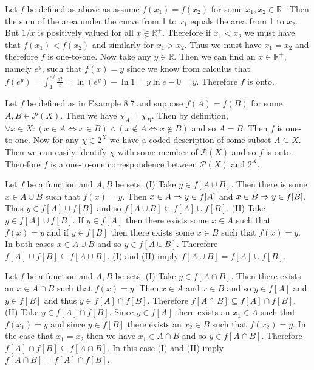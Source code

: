 \documentclass[11pt]{book}
\begin{document}
\begin{enumerate}
{Let $f$ be defined as above as assume $f(x_1)=f(x_2)$ for some $x_1,x_2\in\mathbb{R}^+$ Then the sum of the area under the curve from 1 to $x_1$ equals the area from 1 to $x_2$. But $1/x$ is positively valued for all $x\in\mathbb{R}^+$. Therefore if $x_1<x_2$ we must have that $f(x_1)<f(x_2)$ and similarly for $x_1>x_2$. Thus we must have $x_1=x_2$ and therefore $f$ is one-to-one. Now take any $y\in\mathbb{R}$. Then we can find an $x\in\mathbb{R}^+$, namely $e^y$, such that $f(x) = y$ since we know from calculus that $f(e^y) = \int_{1}^{e^y} \frac{dt}{t} = \ln(e^y) - \ln1 = y\ln e - 0 = y$. Therefore $f$ is onto.}

{Let $f$ be defined as in Example 8.7 and suppose $f(A)=f(B)$ for some $A,B\in\mathcal{P}(X)$. Then we have $\chi_A = \chi_B$. Then by definition, $\forall x\in X: (x\in A \iff x\in B)\land (x\notin A \iff x\notin B)$ and so $A=B$. Then $f$ is one-to-one. Now for any $\chi\in 2^X$ we have a coded description of some subset $A\subseteq X$. Then we can easily identify $\chi$ with some member of $\mathcal{P}(X)$ and so $f$ is onto. Therefore $f$ is a one-to-one correspondence between $\mathcal{P}(X)$ and $2^X$.}

{Let $f$ be a function and $A,B$ be sets. (I) Take $y\in f[A\cup B]$. Then there is some $x\in A\cup B$ such that $f(x)=y$. Then $x\in A \Rightarrow y\in f[A]$ and $x\in B \Rightarrow y\in f[B]$. Thus $y\in f[A]\cup f[B]$ and so $f[A\cup B] \subseteq f[A] \cup f[B]$. (II) Take $y\in f[A]\cup f[B]$. If $y\in f[A]$ then there exists some $x\in A$ such that $f(x)=y$ and if $y\in f[B]$ then there exists some $x\in B$ such that $f(x)=y$. In both cases $x\in A\cup B$ and so $y\in f[A\cup B]$. Therefore $f[A]\cup f[B] \subseteq f[A\cup B]$. (I) and (II) imply $f[A\cup B] = f[A] \cup f[B]$.}

{Let $f$ be a function and $A,B$ be sets. (I) Take $y\in f[A\cap B]$. Then there exists an $x\in A\cap B$ such that $f(x)=y$. Then $x\in A$ and $x\in B$ and so $y\in f[A]$ and $y\in f[B]$ and thus $y\in f[A]\cap f[B]$. Therefore $f[A\cap B]\subseteq f[A]\cap f[B]$. (II) Take $y\in f[A]\cap f[B]$. Since $y\in f[A]$ there exists an $x_1\in A$ such that $f(x_1)=y$ and since $y\in f[B]$ there exists an $x_2\in B$ such that $f(x_2)=y$. In the case that $x_1=x_2$ then we have $x_1\in A\cap B$ and so $y\in f[A\cap B]$. Therefore $f[A]\cap f[B]\subseteq f[A\cap B]$. In this case (I) and (II) imply $f[A\cap B] = f[A]\cap f[B]$.}


\end{enumerate}
\end{document}
